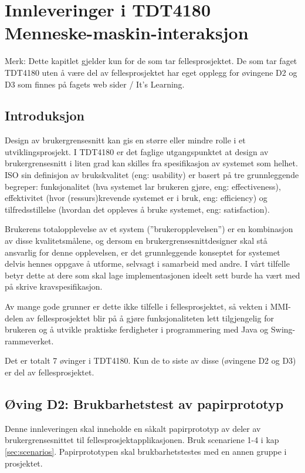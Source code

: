 \section{Innleveringer i TDT4180 Menneske-maskin-interaksjon}

Merk: Dette kapitlet gjelder kun for de som tar fellesprosjektet. De som tar faget TDT4180 uten å være del av fellesprosjektet har eget opplegg for øvingene D2 og D3 som finnes på fagets web sider / It’s Learning.

\subsection{Introduksjon}

Design av brukergrensesnitt kan gis en større eller mindre rolle i et utviklingsprosjekt. I TDT4180 er det faglige utgangspunktet at design av brukergrensesnitt i liten grad kan skilles fra spesifikasjon av systemet som helhet. ISO sin definisjon av brukskvalitet (eng: usability) er basert på tre grunnleggende begreper: funksjonalitet (hva systemet lar brukeren gjøre, eng: effectiveness), effektivitet (hvor (ressurs)krevende systemet er i bruk, eng: efficiency) og tilfredsstillelse (hvordan det oppleves å bruke systemet, eng: satisfaction). 

Brukerens totalopplevelse av et system (”brukeropplevelsen”) er en kombinasjon av disse kvalitetsmålene, og dersom en brukergrensesnittdesigner skal stå ansvarlig for denne opplevelsen, er det grunnleggende konseptet for systemet delvis hennes oppgave å utforme, selvsagt i samarbeid med andre. I vårt tilfelle betyr dette at dere som skal lage implementasjonen ideelt sett burde ha vært med på skrive kravspesifikasjon. 

Av mange gode grunner er dette ikke tilfelle i fellesprosjektet, så vekten i MMI-delen av fellesprosjektet blir på å gjøre funksjonaliteten lett tilgjengelig for brukeren og å utvikle praktiske ferdigheter i programmering med Java og Swing-rammeverket.

Det er totalt 7 øvinger i TDT4180. Kun de to siste av disse (øvingene D2 og D3) er del av fellesprosjektet.

\subsection{Øving D2: Brukbarhetstest av papirprototyp}

Denne innleveringen skal inneholde en såkalt papirprototyp av deler av brukergrensesnittet til fellesprosjektapplikasjonen. Bruk scenariene 1-4 i kap \ref{sec:scenarios}.  Papirprototypen skal brukbarhetstestes med en annen gruppe i prosjektet. 

